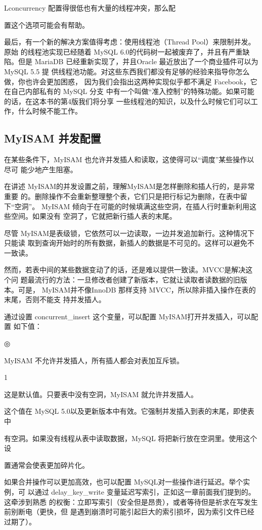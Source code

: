 Lconcurrency 配置得很低也有大量的线程冲突，那么配

置这个选项可能会有帮助。

最后，有一个新的解决方案值得考虑：使用线程池（Thread Pool）来限制并发。原始
的线程池实现已经随着 MySQL 6.0的代码树一起被废弃了，并且有严重缺陷。但是
MariaDB 已经重新实现了，并且Oracle 最近放出了一个商业插件可以为MySQL 5.5 提
供线程池功能。对这些东西我们都没有足够的经验来指导你怎么做，你也许会更加困惑，
因为我们会指出这两种实现似乎都不满足 Facebook，它在自己内部私有的 MySQL 分支
中有一个叫做“准入控制”的特殊功能。如果可能的话，在这本书的第4版我们将分享
一些线程池的知识，以及什么时候它们可以工作，什么时候不能工作。

\subsection{MyISAM 并发配置}
在某些条件下，MyISAM 也允许并发插人和读取，这使得可以“调度”某些操作以尽可
能少地产生阻塞。

在讲述 MyISAM的并发设置之前，理解MyISAM是怎样删除和插人行的，是非常重要
的。删除操作不会重新整理整个表，它们只是把行标记为删除，在表中留下“空洞”。
MyISAM 倾向于在可能的时候填满这些空洞，在插人行时重新利用这些空间。如果没有
空洞了，它就把新行插人表的末尾。

尽管 MyISAM是表级锁，它依然可以一边读取，一边并发追加新行。这种情况下只能读
取到查询开始时的所有数据，新插人的数据是不可见的。这样可以避免不一致读。

然而，若表中间的某些数据变动了的话，还是难以提供一致读。MVCC是解决这个问
题最流行的方法：一旦修改者创建了新版本，它就让读取者读数据的旧版本。可是，
MyISAM并不像InnoDB 那样支持 MVCC，所以除非插入操作在表的末尾，否则不能支
持并发插人。

通过设置 concurrent\_insert 这个变量，可以配置 MyISAM打开并发插入，可以配置
如下值：

◎

MyISAM 不允许并发插人，所有插人都会对表加互斥锁。

1

这是默认值。只要表中没有空洞，MyISAM 就允许并发插人。

这个值在 MySQL 5.0以及更新版本中有效。它强制并发插入到表的末尾，即使表中

有空洞。如果没有线程从表中读取数据，MySQL 将把新行放在空洞里。使用这个设

置通常会使表更加碎片化。

如果合并操作可以更加高效，也可以配置 MySQL对一些操作进行延迟。举个实例，可
以通过 delay\_key\_write 变量延迟写索引，正如这一章前面我们提到的。这牵涉到熟悉
的权衡：立即写索引（安全但是昂贵），或者等待但是祈求在写发生前别断电（更快，但
是遇到崩溃时可能引起巨大的索引损坏，因为索引文件已经过期了）。

